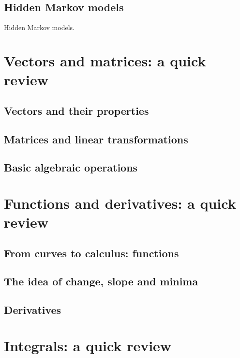 \documentclass{book}
\begin{document}
\newpage

\section{Hidden Markov models}
Hidden Markov models.

\newpage

\appendix

\chapter{Vectors and matrices: a quick review}

\section{Vectors and their properties}

\section{Matrices and linear transformations}

\section{Basic algebraic operations}

\newpage

\chapter{Functions and derivatives: a quick review}

\section{From curves to calculus: functions}

\section{The idea of change, slope and minima}

\section{Derivatives}

\newpage

\chapter{Integrals: a quick review}
\end{document}
